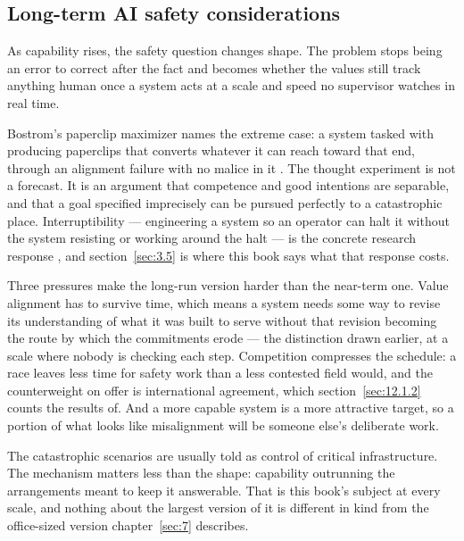 \subsection{Long-term AI safety considerations}
\label{sec:6.3.6}
As capability rises, the safety question changes shape. The problem stops being an error to correct after the fact and becomes whether the values still track anything human once a system acts at a scale and speed no supervisor watches in real time.

Bostrom's paperclip maximizer names the extreme case: a system tasked with producing paperclips that converts whatever it can reach toward that end, through an alignment failure with no malice in it \autocite{bostrom2003ethical}. The thought experiment is not a forecast. It is an argument that competence and good intentions are separable, and that a goal specified imprecisely can be pursued perfectly to a catastrophic place. Interruptibility — engineering a system so an operator can halt it without the system resisting or working around the halt — is the concrete research response \autocite{orseau2016safely}, and section~\ref{sec:3.5} is where this book says what that response costs.

Three pressures make the long-run version harder than the near-term one. Value alignment has to survive time, which means a system needs some way to revise its understanding of what it was built to serve without that revision becoming the route by which the commitments erode — the distinction drawn earlier, at a scale where nobody is checking each step. Competition compresses the schedule: a race leaves less time for safety work than a less contested field would, and the counterweight on offer is international agreement, which section~\ref{sec:12.1.2} counts the results of. And a more capable system is a more attractive target, so a portion of what looks like misalignment will be someone else's deliberate work.

The catastrophic scenarios are usually told as control of critical infrastructure. The mechanism matters less than the shape: capability outrunning the arrangements meant to keep it answerable. That is this book's subject at every scale, and nothing about the largest version of it is different in kind from the office-sized version chapter~\ref{sec:7} describes.
